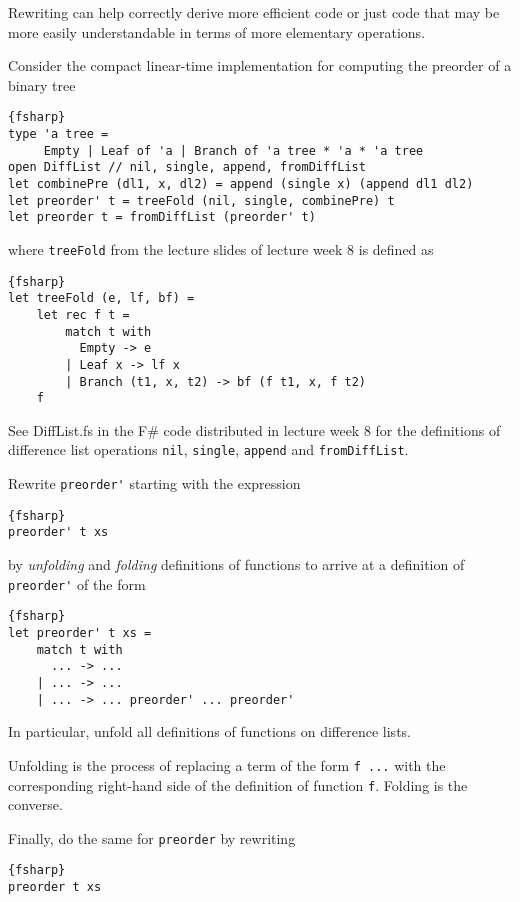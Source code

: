 Rewriting can help correctly derive more efficient code or just code that may be more easily understandable in terms of more elementary operations.

Consider the compact linear-time implementation for computing the preorder of a binary tree
\begin{lstlisting}{fsharp}
type 'a tree = 
     Empty | Leaf of 'a | Branch of 'a tree * 'a * 'a tree
open DiffList // nil, single, append, fromDiffList
let combinePre (dl1, x, dl2) = append (single x) (append dl1 dl2)
let preorder' t = treeFold (nil, single, combinePre) t
let preorder t = fromDiffList (preorder' t)
\end{lstlisting}
where \verb|treeFold| from the lecture slides of lecture week 8 is defined as
\begin{lstlisting}{fsharp}
let treeFold (e, lf, bf) =
    let rec f t = 
        match t with
          Empty -> e
        | Leaf x -> lf x
        | Branch (t1, x, t2) -> bf (f t1, x, f t2)
    f
\end{lstlisting}
See DiffList.fs in the F\# code distributed in lecture week 8 
for the definitions of difference list operations \verb|nil|, \verb|single|, \verb|append| and \verb|fromDiffList|.

Rewrite \verb|preorder'| starting with the expression
\begin{lstlisting}{fsharp}
preorder' t xs
\end{lstlisting}
by \emph{unfolding} and \emph{folding} definitions of functions to arrive at a definition of \verb|preorder'| of the form
\begin{lstlisting}{fsharp}
let preorder' t xs =
    match t with 
      ... -> ... 
    | ... -> ...
    | ... -> ... preorder' ... preorder'
\end{lstlisting}
In particular, unfold all definitions of functions on difference lists.

Unfolding is the process of replacing a term of the form \verb|f ...| with the corresponding right-hand side of the definition of function \verb|f|.
Folding is the converse.

Finally, do the same for \verb|preorder| by rewriting
\begin{lstlisting}{fsharp}
preorder t xs
\end{lstlisting}


